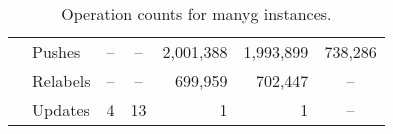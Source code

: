 \documentclass{article}
\begin{document}
\begin{table}[ht]
\begin{center}
\begin{scriptsize}
\begin{tabular}{||c|l|r|r|r|r|r||}
    &   Pushes  &   \multicolumn{1}{|c|}{--}    &   \multicolumn{1}{|c|}{--}    &   2,001,388   &   1,993,899   &   738,286 \\
    &   Relabels    &   \multicolumn{1}{|c|}{--}    &   \multicolumn{1}{|c|}{--}    &   699,959 &   702,447 &   \multicolumn{1}{|c||}{--}   \\
    &   Updates &   4   &   13  &   1   &   1   &   \multicolumn{1}{|c||}{--}   \\  \hline
\hline
\end{tabular}
\end{scriptsize}
\caption{\label{Table:manygopcount} Operation counts for {\sf manyg} instances.}
\end{center}
\end{table}

\clearpage
\newpage
\end{document}
